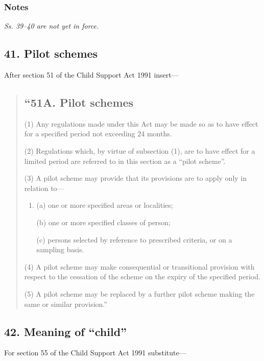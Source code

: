 \documentclass[a4paper]{article}
\newcommand\amendment[1]{\subsubsection*{Notes}{\itshape\frenchspacing\footnotesize #1 \par}}
\begin{document}
\amendment{Ss. 39--40 are not yet in force.}

\subsection{41. Pilot schemes}

After section 51 of the Child Support Act 1991 insert---

\begin{quotation}
\subsection*{``51A. Pilot schemes}

(1) Any regulations made under this Act may be made so as to have effect for a specified period not exceeding 24 months.

(2)
Regulations which, by virtue of subsection (1), are to have effect for a limited period are referred to in this section as a “pilot scheme”.

(3) A pilot scheme may provide that its provisions are to apply only in relation to---
\begin{enumerate}\item[]
(a) one or more specified areas or localities;

(b) one or more specified classes of person;

(c) persons selected by reference to prescribed criteria, or on a sampling basis.
\end{enumerate}

(4)
A pilot scheme may make consequential or transitional provision with respect to the cessation of the scheme on the expiry of the specified period.

(5)
A pilot scheme may be replaced by a further pilot scheme making the same or similar provision.''
\end{quotation}

\subsection{42. Meaning of ``child''}

For section 55 of the Child Support Act 1991 substitute---
\end{document}
